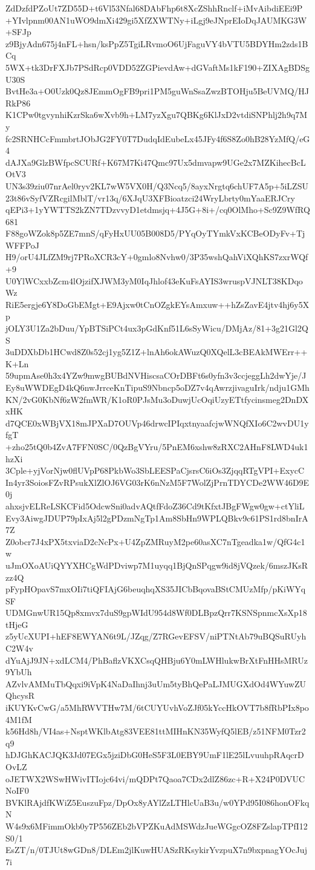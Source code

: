 ZdDzfdPZoUt7ZD55D+t6Vl53Nfal68DAbFhp6t8XcZShhRnclf+iMvAibdiEEi9P
+YIvlpnm00AN1uWO9dmXi429gi5XfZXWTNy+iLgj9eJNprEIoDqJAUMKG3W+SFJp
z9BjyAdn675j4nFL+hsn/ksPpZ5TgiLRvmoO6UjFaguVY4bVTU5BDYHm2zds1BCq
5WX+tk3DrFXJb7PSdRcp0VDD52ZGPievdAw+dGVaftMs1kF190+ZIXAgBDSgU30S
BvtHe3a+O0Uzk0Qz8JEmmOgFB9pri1PM5guWnSsaZwzBTOHju5BeUVMQ/HJRkP86
K1CPw0tgvynhiKzrSka6wXvb9h+LM7yzXgu7QBKg6KlJxD2vtdiSNPhlj2h9q7My
fc2SRNHCcFmmbrtJObJG2FY0T7DudqIdEubeLx45JFy4f6S8Zo0hB28YzMfQ/eG4
dAJXa9GlzBWfpcSCURf+K67M7Ki47Qmc97Ux5dmvapw9UGe2x7MZKihecBcLOtV3
UN3s39ziu07nrAel0ryv2KL7wW5VX0H/Q3Ncq5/8ayxNrgtq6chUF7A5p+5iLZSU
23t86vSyfVZRcgilMblT/vr13q/6XJqU3XFBioatzci24WryLbrty0mYaaERJCry
qEPi3+1yYWTTS2kZN7TDzvvyD1etdmsjq+4J5G+8i+/cq0OlMho+Sc9Z9WfRQ681
F88goWZok8p5ZE7mnS/qFyHxUU05B008D5/PYqOyTYmkVxKCBeODyFv+TjWFFPoJ
H9/orU4JLfZM9rj7PRoXCR3cY+0gmlo8Nvhw0/3P35wshQahViXQhKS7zxrWQf+9
U0YlWCxxbZcm4lOjzifXJWM3yM0IqJhlof43eKuFsAYIS3wruspVJNLT38KDqoWz
RiE5ergje6Y8DoGbEMgt+E9Ajxw0tCnOZgkEYsAmxuw++hZsZavE4jtv4hj6y5Xp
jOLY3U1Za2bDuu/YpBTSiPCt4ux3pGdKnf51L6sSyWicu/DMjAz/81+3g21Gl2QS
3uDDXbDb1HCwd8Z0s52cj1yg5Z1Z+lnAh6okAWuzQ0XQelL3cBEAkMWErr++K+Ln
59upmAse0h3x4YZw9mwgBUBdNVHiscsaCOrDBFt6s0yfn3v3ccjeggLh2dwYje/J
Ey8uWWDEgD4kQ6nwJrrceKnTipuS9Nbncp5oDZ7v4qAwrzjivaguIrk/ndju1GMh
KN/2vG0KbNf6zW2fmWR/K1oR0PJsMu3oDuwjUcOqiUzyETtfycinsmeg2DnDXxHK
d7QCE0xWBjVX18mJPXaD7OUVp46drwcIPIqxtnyaafcjwWNQfXIo6C2wvDU1yfgT
+zho25tQ0b4ZvA7FFN0SC/0QzBgVYru/5PnEM6xshw8zRXC2AHnF8LWD4uk1hzXi
3Cple+yjVorNjw0flUVpP68PkbWo3SbLEESPaCjsrsC6iOs3ZjqqRTgVPI+ExycC
In4yr3SoiosFZvRPsukXlZlOJ6VG03rK6nNzM5F7WolZjPrnTDYCDe2WW46D9E0j
ahxsjvELReLSKCFid5OdcwSni0advAQtfFdoZ36Cd9tKfxtJBgFWgw0gw+ctYliL
Evy3AiwgJDUP79pIxAj5l2gPDzmNgTp1Am8SbHn9WPLQBkv9c61PS1rd8bnIrA7Z
Z0obcr7J4xPX5txviaD2cNcPx+U4ZpZMRuyM2pe60asXC7nTgeadka1w/QfG4c1w
uJmOXoAUiQYYXHCgWdPDviwp7M1uyqq1BjQnSPqgw9id8jVQzek/6mszJKsRzz4Q
pFypHOpavS7mxOIi7tiQFIAjG6beuqhqXS35JICbBqovaBStCMUzMfp/pKiWYqSF
UDMGnwUR15Qp8xmvx7duS9gpWIdU954d8Wf0DLBpzQrr7KSNSpnmcXsXp18tHjeG
z5yUcXUPI+hEF8EWYAN6t9L/JZqg/Z7RGevEFSV/niPTNtAb79uBQSuRUyhC2W4v
dYuAjJ9JN+xdLCM4/PhBaflzVKXCsqQHBju6Y0mLWHlukwBrXtFnHHsMRUz9YbUh
AZvlvAMMuTbQqxi9iVpK4NaDaIhnj3uUm5tyBhQePaLJMUGXdOd4WYuwZUQhcysR
iKUYKvCwG/a5MhRWVTHw7M/6tCUYUvhVoZJf05kYccHkOVT7b8fRbPIx8po4M1fM
k56Hd8h/VI4as+NsptWKlbAtg83VEE81ttMIHnKN35WyfQ5lEB/z51NFM0Tzr2q9
hDJGhKACJQK3Jd07EGx5jziDbG0HeS5F3L0EBY9UmF1lE25lLvuuhpRAqcrDOvLZ
oJETWX2WSwHWivITIojc64vi/mQDPt7Qaoa7CDx2dlZ86zc+R+X24P0DVUCNoIF0
BVKlRAjdfKWiZ5EuszuFpz/DpOx8yAYlZzLTHlcUaB3u/w0YPd95I086honOFkqN
W4s9x6MFimmOkb0y7P556ZEb2bVPZKuAdMSWdzJueWGgcOZ8FZslapTPfI12S0/1
EsZT/n/0TJUt8wGDn8/DLEm2jlKuwHUASzRKsykirYvzpuX7n9bxpnagYOcJuj7i

